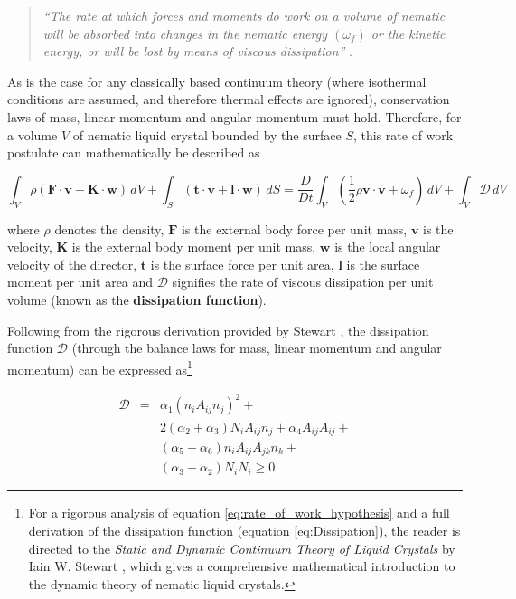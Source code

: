 \begin{quote}
\textit{``The rate at which forces and moments do work on a volume of nematic will be absorbed into changes in the nematic energy $\left(\omega_f\right)$ or the kinetic energy, or will be lost by means of viscous dissipation''} \cite{Stewart2004}.
\end{quote}

\noindent As is the case for any classically based continuum theory (where isothermal conditions are assumed, and therefore thermal effects are ignored), conservation laws of mass, linear momentum and angular momentum must hold. Therefore, for a volume $V$ of nematic liquid crystal bounded by the surface $S$, this rate of work postulate can mathematically be described as 

\begin{widetext}
\begin{equation}
\int_V \! \rho\left(\mathbf{F}\cdot\mathbf{v}+\mathbf{K}\cdot\mathbf{w}\right)\,dV+\int_S\!\left(\mathbf{t}\cdot\mathbf{v}+\mathbf{l}\cdot\mathbf{w}\right)\,dS=\frac{D}{Dt}\int_V\!\left(\frac{1}{2}\rho\mathbf{v}\cdot\mathbf{v}+\omega_f\right)\,dV+\int_V\!\mathcal{D}\,dV
\label{eq:rate_of_work_hypothesis}
\end{equation}
\end{widetext}

\noindent where $\rho$ denotes the density, $\mathbf{F}$ is the external body force per unit mass, $\mathbf{v}$ is the velocity, $\mathbf{K}$ is the external body moment per unit mass, $\mathbf{w}$ is the local angular velocity of the director, $\mathbf{t}$ is the surface force per unit area, $\mathbf{l}$ is the surface moment per unit area and $\mathcal{D}$ signifies the rate of viscous dissipation per unit volume (known as the \textbf{dissipation function}).

Following from the rigorous derivation provided by Stewart \cite{Stewart2004}, the dissipation function $\mathcal{D}$ (through the balance laws for mass, linear momentum and angular momentum) can be expressed as\footnote{For a rigorous analysis of equation \ref{eq:rate_of_work_hypothesis} and a full derivation of the dissipation function (equation \ref{eq:Dissipation}), the reader is directed to the \textit{Static and Dynamic Continuum Theory of Liquid Crystals} by Iain W. Stewart \cite{Stewart2004}, which gives a comprehensive mathematical introduction to the dynamic theory of nematic liquid crystals.}

\begin{eqnarray}
\nonumber\mathcal{D}&=&\alpha_1\left(n_iA_{ij}n_j\right)^2+ \\
&&2\left(\alpha_2+\alpha_3\right)N_iA_{ij}n_j+\alpha_4A_{ij}A_{ij}+ \\
&&\left(\alpha_5+\alpha_6\right)n_iA_{ij}A_{jk}n_k+ \\
&&\left(\alpha_3-\alpha_2\right)N_iN_i\geq0
\label{eq:Dissipation}
\end{eqnarray}


